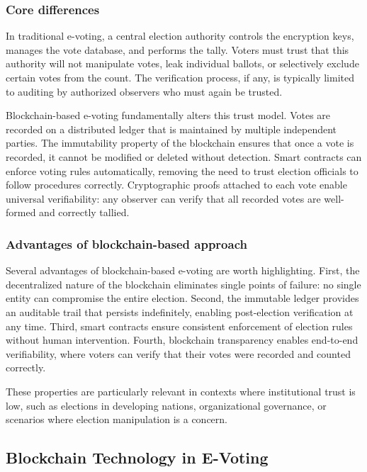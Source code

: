 \subsubsection{Core differences}
\label{subsubsec:core-diff}

In traditional e-voting, a central election authority controls the encryption keys, manages the vote database, and performs the tally. Voters must trust that this authority will not manipulate votes, leak individual ballots, or selectively exclude certain votes from the count. The verification process, if any, is typically limited to auditing by authorized observers who must again be trusted.

Blockchain-based e-voting fundamentally alters this trust model. Votes are recorded on a distributed ledger that is maintained by multiple independent parties. The immutability property of the blockchain ensures that once a vote is recorded, it cannot be modified or deleted without detection. Smart contracts can enforce voting rules automatically, removing the need to trust election officials to follow procedures correctly. Cryptographic proofs attached to each vote enable universal verifiability: any observer can verify that all recorded votes are well-formed and correctly tallied.

\subsubsection{Advantages of blockchain-based approach}
\label{subsubsec:blockchain-advantages}

Several advantages of blockchain-based e-voting are worth highlighting. First, the decentralized nature of the blockchain eliminates single points of failure: no single entity can compromise the entire election. Second, the immutable ledger provides an auditable trail that persists indefinitely, enabling post-election verification at any time. Third, smart contracts ensure consistent enforcement of election rules without human intervention. Fourth, blockchain transparency enables end-to-end verifiability, where voters can verify that their votes were recorded and counted correctly.

These properties are particularly relevant in contexts where institutional trust is low, such as elections in developing nations, organizational governance, or scenarios where election manipulation is a concern.

\subsection{Blockchain Technology in E-Voting}
\label{subsec:blockchain-tech}

